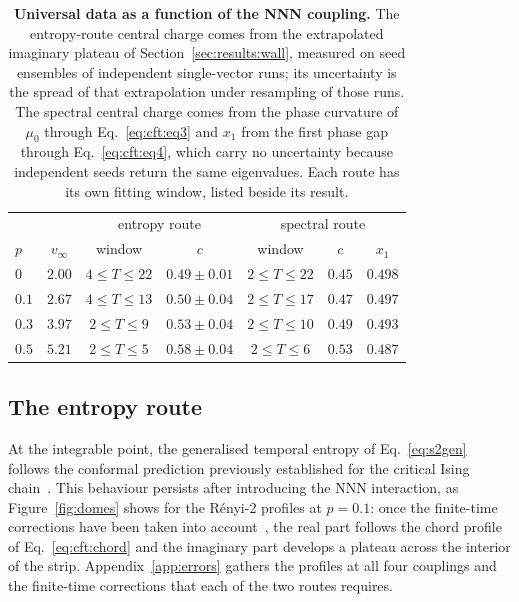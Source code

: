 \begin{table}[!htbp]
    \centering
    \begin{tabular}{lc|cc|ccc}
        \hline
              &            & \multicolumn{2}{c|}{entropy route} & \multicolumn{3}{c}{spectral route}                                    \\
        $p$   & $v_\infty$ & window                             & $c$                                & window        & $c$    & $x_1$   \\
        \hline
        $0$   & $2.00$     & $4\le T\le22$                      & $0.49\pm0.01$                      & $2\le T\le22$ & $0.45$ & $0.498$ \\
        $0.1$ & $2.67$     & $4\le T\le13$                      & $0.50\pm0.04$                      & $2\le T\le17$ & $0.47$ & $0.497$ \\
        $0.3$ & $3.97$     & $2\le T\le9$                       & $0.53\pm0.04$                      & $2\le T\le10$ & $0.49$ & $0.493$ \\
        $0.5$ & $5.21$     & $2\le T\le5$                       & $0.58\pm0.04$                      & $2\le T\le6$  & $0.53$ & $0.487$ \\
        \hline
    \end{tabular}
    \caption{\textbf{Universal data as a function of the \ac{NNN} coupling.} The entropy-route central charge comes from the extrapolated imaginary plateau of Section~\ref{sec:results:wall}, measured on seed ensembles of independent single-vector runs; its uncertainty is the spread of that extrapolation under resampling of those runs. The spectral central charge comes from the phase curvature of $\mu_0$ through Eq.~\eqref{eq:cft:eq3} and $x_1$ from the first phase gap through Eq.~\eqref{eq:cft:eq4}, which carry no uncertainty because independent seeds return the same eigenvalues. Each route has its own fitting window, listed beside its result.}
    \label{tab:cp}
\end{table}

\subsection{The entropy route}
\label{sec:results:validation}
\label{sec:results:wall}

At the integrable point, the generalised temporal entropy of Eq.~\eqref{eq:s2gen} follows the conformal prediction previously established for the critical Ising chain~\cite{carignano_tagliacozzo2025}. This behaviour persists after introducing the \ac{NNN} interaction, as Figure~\ref{fig:domes} shows for the R\'enyi-2 profiles at $p=0.1$: once the finite-time corrections have been taken into account~\cite{boucomas2026}, the real part follows the chord profile of Eq.~\eqref{eq:cft:chord} and the imaginary part develops a plateau across the interior of the strip. Appendix~\ref{app:errors} gathers the profiles at all four couplings and the finite-time corrections that each of the two routes requires.

